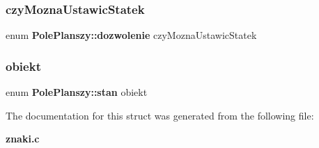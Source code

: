 \subsubsection{czy\+Mozna\+Ustawic\+Statek}
{\footnotesize\ttfamily enum \textbf{ Pole\+Planszy\+::dozwolenie}  czy\+Mozna\+Ustawic\+Statek}

\mbox{\label{struct_pole_planszy_acd321f28d07638a16606425cdcd582dd}} 
\subsubsection{obiekt}
{\footnotesize\ttfamily enum \textbf{ Pole\+Planszy\+::stan}  obiekt}



The documentation for this struct was generated from the following file\+:\begin{DoxyCompactItemize}
\item 
\textbf{ znaki.\+c}\end{DoxyCompactItemize}
